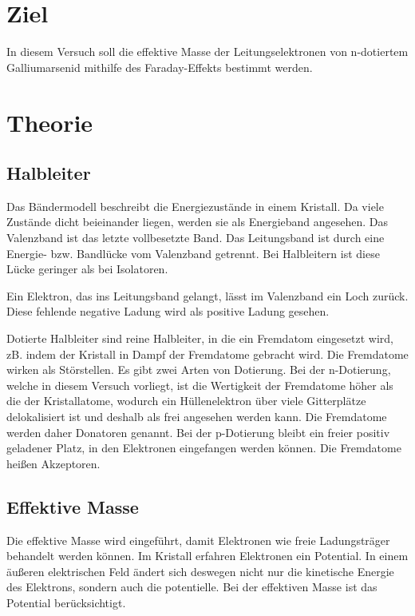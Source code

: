 \section{Ziel}
In diesem Versuch soll die effektive Masse der Leitungselektronen von n-dotiertem Galliumarsenid mithilfe des Faraday-Effekts bestimmt werden.

\section{Theorie}
\label{sec:Theorie}

\subsection{Halbleiter}
Das Bändermodell beschreibt die Energiezustände in einem Kristall. Da viele Zustände dicht beieinander liegen, werden sie als Energieband angesehen. Das Valenzband ist das letzte vollbesetzte Band. Das Leitungsband ist durch eine Energie- bzw. Bandlücke vom Valenzband getrennt. Bei Halbleitern ist diese Lücke geringer als bei Isolatoren. 

Ein Elektron, das ins Leitungsband gelangt, lässt im Valenzband ein Loch zurück. Diese fehlende negative Ladung wird als positive Ladung gesehen. \cite{demtroeder}

Dotierte Halbleiter sind reine Halbleiter, in die ein Fremdatom eingesetzt wird, zB. indem der Kristall in Dampf der Fremdatome gebracht wird. Die Fremdatome wirken als Störstellen.
Es gibt zwei Arten von Dotierung. Bei der n-Dotierung, welche in diesem Versuch vorliegt, ist die Wertigkeit der Fremdatome höher als die der Kristallatome, wodurch ein Hüllenelektron über viele Gitterplätze delokalisiert ist und deshalb als frei angesehen werden kann. Die Fremdatome werden daher Donatoren genannt. Bei der p-Dotierung bleibt ein freier positiv geladener Platz, in den Elektronen eingefangen werden können. Die Fremdatome heißen Akzeptoren. \cite{demtroeder}


\subsection{Effektive Masse}
Die effektive Masse wird eingeführt, damit Elektronen wie freie Ladungsträger behandelt werden können. Im Kristall erfahren Elektronen ein Potential. In einem äußeren elektrischen Feld ändert sich deswegen nicht nur die kinetische Energie des Elektrons, sondern auch die potentielle. Bei der effektiven Masse ist das Potential berücksichtigt. \cite{demtroeder}

